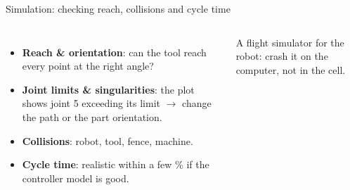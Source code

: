 \documentclass[aspectratio=169,10pt]{beamer}
\begin{document}
\begin{frame}[t]{Simulation: checking reach, collisions and cycle time}
\begin{columns}[T,onlytextwidth]
\begin{itemize}\small
\item \textbf{Reach \& orientation}: can the tool reach every point at the right angle?
\item \textbf{Joint limits \& singularities}: the plot shows joint 5 exceeding its limit $\to$ change the path or the part orientation.
\item \textbf{Collisions}: robot, tool, fence, machine.
\item \textbf{Cycle time}: realistic within a few \% if the controller model is good.
\end{itemize}
\begin{keybox}[Analogy]
A flight simulator for the robot: crash it on the computer, not in the cell.
\end{keybox}
\end{columns}
\end{frame}
\end{document}
